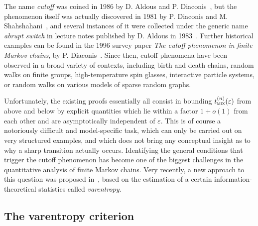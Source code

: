 \documentclass[AHL,Unicode,longabstracts,published]{cedram}
\newcommand{\tmix}{t_{\textsc{mix}}}
\begin{document}
The name \emph{cutoff} was coined in 1986 by D. Aldous and P. Diaconis~\cite{aldous1986shuffling}, but the phenomenon itself was actually discovered in 1981 by P. Diaconis and M. Shahshahani~\cite{diaconis1981generating}, and several instances of it were collected under the generic name \emph{abrupt switch} in lecture notes published by D. Aldous in 1983~\cite{aldous1983mixing}. Further historical examples can be found in the 1996 survey paper \emph{The cutoff phenomenon in finite Markov chains}, by P. Diaconis~\cite{diaconis1996cutoff}. Since then, cutoff phenomena have been observed in a broad variety of contexts, including birth and death chains, random walks on finite groups, high-temperature spin glasses, interactive particle systems, or random walks on various models of sparse random graphs.

Unfortunately, the existing proofs essentially all consist in bounding $\tmix^{(n)}(\varepsilon)$ from above and below by explicit quantities which lie within a factor $1+o(1)$ from each other and are asymptotically independent of $\varepsilon$. This is of course a notoriously difficult and model-specific task, which can only be carried out on very structured examples, and which does not bring any conceptual insight as to why a sharp transition actually occurs. Identifying the general conditions that trigger the cutoff phenomenon has become one of the biggest challenges in the quantitative analysis of finite Markov chains. Very recently, a new approach to this question was proposed in~\cite{arxiv.2102.05597}, based on the estimation of a certain information-theoretical statistics called
\emph{varentropy}.



\subsection{The varentropy criterion}
\end{document}
